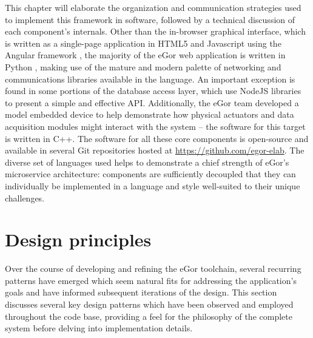 \documentclass[../thesis]{subfiles}
\begin{document}
This chapter will elaborate the organization and communication
strategies used to implement this framework in software, followed by a
technical discussion of each component's internals.  Other than the
in-browser graphical interface, which is written as a single-page
application in HTML5 and Javascript using the Angular framework
\cite{Angular}, the majority of the eGor web application is written in
Python \cite{Python}, making use of the mature and modern palette of
networking and communications libraries available in the language. An
important exception is found in some portions of the database access
layer, which use NodeJS \cite{NodeJS} libraries to present a simple
and effective API. Additionally, the eGor team developed a model
embedded device to help demonstrate how physical actuators and data
acquisition modules might interact with the system -- the software for
this target is written in C++. The software for all these core
components is open-source and available in several Git repositories
hosted at \url{https://github.com/egor-elab}. The diverse set of
languages used helps to demonstrate a chief strength of eGor's
microservice architecture: components are sufficiently decoupled that
they can individually be implemented in a language and style
well-suited to their unique challenges.



\section{Design principles}

Over the course of developing and refining the eGor toolchain, several
recurring patterns have emerged which seem natural fits for addressing
the application's goals and have informed subsequent iterations of the
design. This section discusses several key design patterns which have
been observed and employed throughout the code base, providing a feel
for the philosophy of the complete system before delving into
implementation details.
\end{document}
